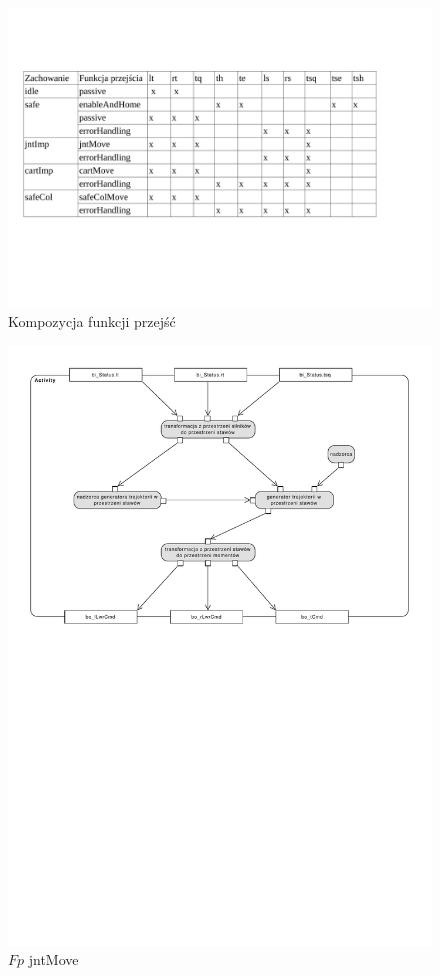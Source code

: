 \documentclass[]{article}
\begin{document}
\begin{figure}[H]
	\centering
	\includegraphics[width=0.9\linewidth]{przejscia}
	\caption{Kompozycja funkcji przejść}
	\label{tab:fp}
\end{figure}

\begin{figure}[H]
	\centering
	\includegraphics[width=0.9\linewidth]{jntMove}
	\caption{$Fp$ jntMove}
	\label{fig:jnt}
\end{figure}
\end{document}
